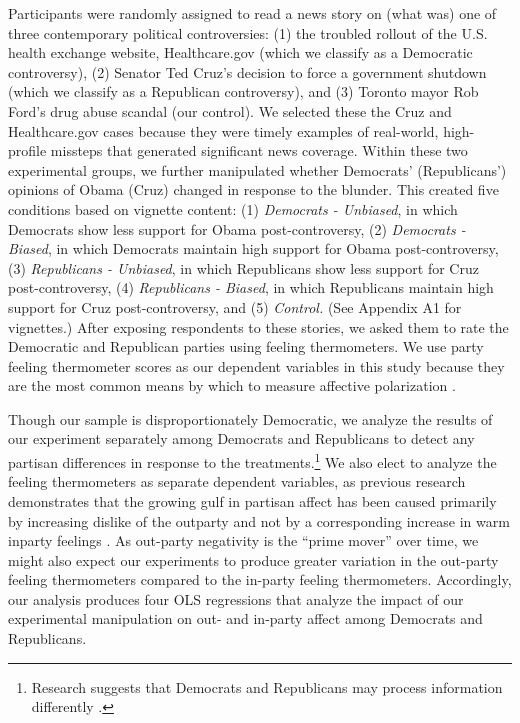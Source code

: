\documentclass[12pt, letterpaper]{article}
\begin{document}
Participants were randomly assigned to read a news story on (what was) one of three contemporary political controversies: (1) the troubled rollout of the U.S. health exchange website, Healthcare.gov (which we classify as a Democratic controversy), (2) Senator Ted Cruz's decision to force a government shutdown (which we classify as a Republican controversy), and (3) Toronto mayor Rob Ford's drug abuse scandal (our control). We selected these the Cruz and Healthcare.gov cases because they were timely examples of real-world, high-profile missteps that generated significant news coverage. Within these two experimental groups, we further manipulated whether Democrats' (Republicans') opinions of Obama (Cruz) changed in response to the blunder. This created five conditions based on vignette content:  (1) \textit{Democrats - Unbiased}, in which Democrats show less support for Obama post-controversy, (2) \textit{Democrats - Biased}, in which Democrats maintain high support for Obama post-controversy, (3) \textit{Republicans - Unbiased}, in which Republicans show less support for Cruz post-controversy, (4) \textit{Republicans - Biased}, in which Republicans maintain high support for Cruz post-controversy, and (5) \textit{Control.} (See Appendix A1 for vignettes.) After exposing respondents to these stories, we asked them to rate the Democratic and Republican parties using feeling thermometers. We use party feeling thermometer scores as our dependent variables in this study because they are the most common means by which to measure affective polarization \citep[e.g.,][]{haidthetherington_2012,hetheringtonrudolph_2015,IyengarSoodLelkes2012,IyengarWestwood2014,mason_2015}. 

Though our sample is disproportionately Democratic, we analyze the results of our experiment separately among Democrats and Republicans to detect any partisan differences in response to the treatments.\footnote{Research suggests that Democrats and Republicans may process information differently \citep{grossmanhopkins_2016}.} We also elect to analyze the feeling thermometers as separate dependent variables, as previous research demonstrates that the growing gulf in partisan affect has been caused primarily by increasing dislike of the outparty and not by a corresponding increase in warm inparty feelings \citep{haidthetherington_2012, IyengarSoodLelkes2012}. As out-party negativity is the ``prime mover'' over time, we might also expect our experiments to produce greater variation in the out-party feeling thermometers compared to the in-party feeling thermometers. Accordingly, our analysis produces four OLS regressions that analyze the impact of our experimental manipulation on out- and in-party affect among Democrats and Republicans. 
\end{document}
